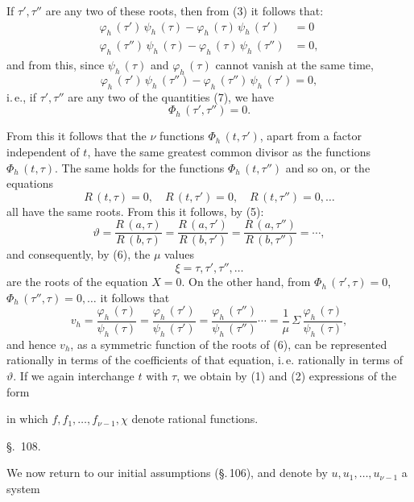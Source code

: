If $\tau', \tau''$ are any two of these roots, then from (3) it follows that:
\[
\begin{aligned}
\varphi_h\,(\tau')\,\psi_h\,(\tau) - \varphi_h\,(\tau)\,\psi_h\,(\tau') &= 0\\
\varphi_h\,(\tau'')\,\psi_h\,(\tau) - \varphi_h\,(\tau)\,\psi_h\,(\tau'') &= 0,
\end{aligned}
\]
and from this, since $\psi_h\,(\tau)$ and $\varphi_h\,(\tau)$ cannot vanish
at the same time,
\[
\varphi_h\,(\tau')\,\psi_h\,(\tau'') - \varphi_h\,(\tau'')\,\psi_h\,(\tau') = 0,
\]
i.\,e., if $\tau', \tau''$ are any two of the quantities (7), we have
\[
\Phi_h\,(\tau', \tau'') = 0.
\]

From this it follows that the $\nu$ functions $\Phi_h\,(t,\tau')$, apart from a
factor independent of $t$, have the same greatest common divisor as the
functions $\Phi_h\,(t,\tau)$. The same holds for the functions
$\Phi_h\,(t,\tau'')$ and so on, or the equations
\[
R\,(t,\tau) = 0, \quad R\,(t,\tau') = 0, \quad R\,(t,\tau'') = 0, \ldots
\]
all have the same roots. From this it follows, by (5):
\[
\vartheta = \dfrac{R\,(a,\tau)}{R\,(b,\tau)} = \dfrac{R\,(a,\tau')}{R\,(b,\tau')} = \dfrac{R\,(a,\tau'')}{R\,(b,\tau'')} = \cdots,
\]
and consequently, by (6), the $\mu$ values
\[
\xi = \tau, \tau', \tau'', \ldots
\]
are the roots of the equation $X = 0$. On the other hand, from
$\Phi_h\,(\tau',\tau) = 0$, $\Phi_h\,(\tau'',\tau) = 0, \ldots$ it follows that
\[
v_h = \dfrac{\varphi_h\,(\tau)}{\psi_h\,(\tau)} = \dfrac{\varphi_h\,(\tau')}{\psi_h\,(\tau')} = \dfrac{\varphi_h\,(\tau'')}{\psi_h\,(\tau'')} \cdots = \dfrac{1}{\mu}\,\Sigma\,\dfrac{\varphi_h\,(\tau)}{\psi_h\,(\tau)},
\]
and hence $v_h$, as a symmetric function of the roots of (6), can be
represented rationally in terms of the coefficients of that equation,
i.\,e. rationally in terms of $\vartheta$. If we again interchange $t$ with
$\tau$, we obtain by (1) and (2) expressions of the form


in which $f, f_1, \ldots, f_{\nu-1}, \chi$ denote rational functions.

\begin{center}
\S.\ 108.\\
\end{center}

We now return to our initial assumptions (\S.\,106), and denote by
$u, u_1, \ldots, u_{\nu-1}$ a system
